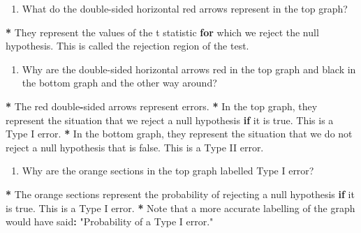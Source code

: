 \documentclass[a4paper]{book}
\newenvironment{Shaded}{\begin{snugshade}}{\end{snugshade}}
\newcommand{\StringTok}[1]{\textcolor[rgb]{0.00,0.00,0.00}{#1}}
\newcommand{\ControlFlowTok}[1]{\textcolor[rgb]{0.00,0.00,0.00}{\textbf{#1}}}
\newcommand{\OperatorTok}[1]{\textcolor[rgb]{0.00,0.00,0.00}{\textbf{#1}}}
\newcommand{\NormalTok}[1]{#1}
\providecommand{\tightlist}{%
  \setlength{\itemsep}{0pt}\setlength{\parskip}{0pt}}
\theoremstyle{definition}
\theoremstyle{definition}
\theoremstyle{definition}
\theoremstyle{remark}
\begin{document}
\begin{enumerate}
\def\labelenumi{\arabic{enumi}.}
\setcounter{enumi}{4}
\tightlist
\item
  What do the double-sided horizontal red arrows represent in the top
  graph?
\end{enumerate}

\begin{Shaded}
\begin{Highlighting}[]
\OperatorTok{*}\StringTok{ }\NormalTok{They represent the values of the t statistic }\ControlFlowTok{for}\NormalTok{ which we reject the null}
\NormalTok{hypothesis. This is called the rejection region of the test.}
\end{Highlighting}
\end{Shaded}

\begin{enumerate}
\def\labelenumi{\arabic{enumi}.}
\setcounter{enumi}{5}
\tightlist
\item
  Why are the double-sided horizontal arrows red in the top graph and
  black in the bottom graph and the other way around?
\end{enumerate}

\begin{Shaded}
\begin{Highlighting}[]
\OperatorTok{*}\StringTok{ }\NormalTok{The red double}\OperatorTok{-}\NormalTok{sided arrows represent errors.}
\OperatorTok{*}\StringTok{ }\NormalTok{In the top graph, they represent the situation that we reject a null}
\NormalTok{hypothesis }\ControlFlowTok{if}\NormalTok{ it is true. This is a Type I error.}
\OperatorTok{*}\StringTok{ }\NormalTok{In the bottom graph, they represent the situation that we do not reject a}
\NormalTok{null hypothesis that is false. This is a Type II error.}
\end{Highlighting}
\end{Shaded}

\begin{enumerate}
\def\labelenumi{\arabic{enumi}.}
\setcounter{enumi}{6}
\tightlist
\item
  Why are the orange sections in the top graph labelled Type I error?
\end{enumerate}

\begin{Shaded}
\begin{Highlighting}[]
\OperatorTok{*}\StringTok{ }\NormalTok{The orange sections represent the probability of rejecting a null hypothesis}
\ControlFlowTok{if}\NormalTok{ it is true. This is a Type I error.}
\OperatorTok{*}\StringTok{ }\NormalTok{Note that a more accurate labelling of the graph would have said}\OperatorTok{:}
\StringTok{"Probability of a Type I error."}
\end{Highlighting}
\end{Shaded}
\end{document}
